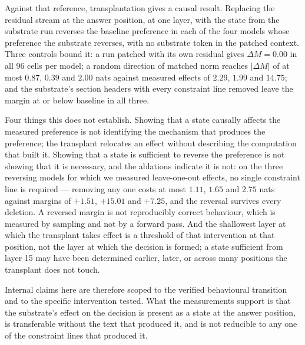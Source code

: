 Against that reference, transplantation gives a causal result. Replacing the
residual stream at the answer position, at one layer, with the state from the
substrate run reverses the baseline preference in each of the four models whose
preference the substrate reverses, with no substrate token in the patched context.
Three controls bound it: a run patched with its own residual gives $\Delta M = 0.00$
in all 96 cells per model; a random direction of matched norm reaches
$|\Delta M|$ of at most $0.87$, $0.39$ and $2.00$ nats against measured effects of
$2.29$, $1.99$ and $14.75$; and the substrate's section headers with every
constraint line removed leave the margin at or below baseline in all three.

Four things this does not establish. Showing that a state causally affects the
measured preference is not identifying the mechanism that produces the preference;
the transplant relocates an effect without describing the computation that built
it. Showing that a state is sufficient to reverse the preference is not showing that
it is necessary, and the ablations indicate it is not: on the three reversing models
for which we measured leave-one-out effects, no single constraint line is required
--- removing any one costs at most $1.11$, $1.65$ and $2.75$ nats against margins of
$+1.51$, $+15.01$ and $+7.25$, and the reversal survives every deletion. A reversed
margin is not reproducibly correct behaviour, which is measured by sampling and not
by a forward pass. And the shallowest layer at which the transplant takes effect is
a threshold of that intervention at that position, not the layer at which the
decision is formed; a state sufficient from layer 15 may have been determined
earlier, later, or across many positions the transplant does not touch.

Internal claims here are therefore scoped to the verified behavioural transition and
to the specific intervention tested. What the measurements support is that the
substrate's effect on the decision is present as a state at the answer position, is
transferable without the text that produced it, and is not reducible to any one of
the constraint lines that produced it.

